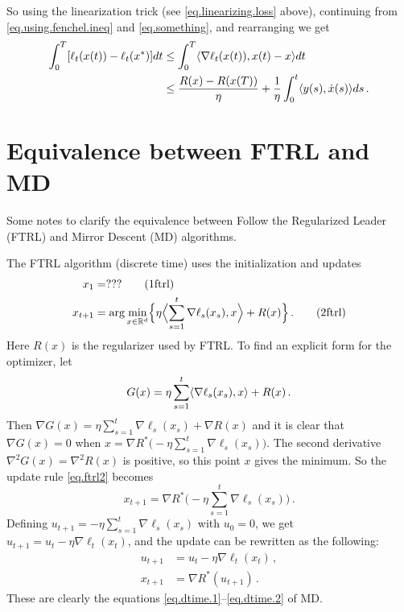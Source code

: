 \documentclass[12pt]{article}
\theoremstyle{plain}
\theoremstyle{definition}
\theoremstyle{remark}
\begin{document}
\noindent
So using the linearization trick (see \eqref{eq.linearizing.loss} above),
continuing from \eqref{eq.using.fenchel.ineq} and \eqref{eq.something},
and rearranging we get
\begin{align*}
\int_{0}^{T} [\ell_{t}(x(t)) - \ell_{t}(x^{*})] dt
&\leq \int_{0}^{T} \langle {\nabla\ell_{t}(x(t)), x(t) - x}\rangle dt \\
&\leq \frac{R(x) - R(x(T))}{\eta} + \frac{1}{\eta} \int_{0}^{t} \langle {y(s), \dot{x}(s)}\rangle ds\,.
\end{align*}

\newpage

\section*{Equivalence between FTRL and MD}

Some notes to clarify the equivalence between 
Follow the Regularized Leader (FTRL) and Mirror Descent (MD) algorithms.

\medskip

The FTRL algorithm (discrete time) uses the initialization and updates
\begin{align}
x_1 &= ??? \label{eq.ftrl1} \tag{1ftrl} \\
x_{t+1} &= \arg\min_{x \in \mathbb{R}^d} \Bigl\{ \eta \Bigl\langle { \sum_{s=1}^{t} \nabla\ell_s(x_{s}), x} \Bigr\rangle + R(x)\Bigr\}\,.
 \label{eq.ftrl2} 
\tag{2ftrl}
\end{align}
Here $R(x)$ is the regularizer used by FTRL.
To find an explicit form for the optimizer, let
$$
G(x) = \eta \sum_{s=1}^{t} \langle { \nabla\ell_s(x_{s}), x}\rangle + R(x)\,.
$$
Then $\nabla G(x) = \eta \sum_{s=1}^{t} \nabla\ell_s(x_{s}) + \nabla R(x)$
and it is clear that $\nabla G(x) = 0$ 
when $x = \nabla R^{*} \bigl( -\eta \sum_{s=1}^{t} \nabla\ell_s(x_{s}) \bigr)$.
The second derivative $\nabla^2 G(x) = \nabla^2 R(x)$ is positive,
so this point $x$ gives the minimum.
So the update rule \eqref{eq.ftrl2} becomes
$$
x_{t+1} = \nabla R^{*} \bigl( -\eta \sum_{s=1}^{t} \nabla\ell_s(x_{s}) \bigr)\,.
$$
Defining $u_{t+1} = -\eta \sum_{s=1}^{t} \nabla\ell_s(x_{s})$ with $u_{0} = 0$,
we get $u_{t+1} = u_{t} - \eta \nabla\ell_t(x_{t})$,
and the update can be rewritten as the following:
\begin{align*}
u_{t+1} &= u_{t} - \eta \nabla \ell_{t}(x_{t})\,, \\
x_{t+1} &= \nabla R^{*}(u_{t+1})\,. 
\end{align*}
These are clearly the equations \eqref{eq.dtime.1}--\eqref{eq.dtime.2} of MD.
\end{document}
